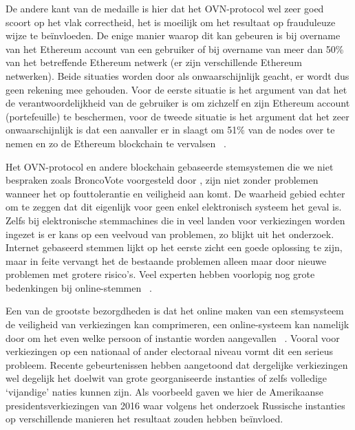 	De andere kant van de medaille is hier dat het OVN-protocol wel zeer goed scoort op het vlak correctheid, het is moeilijk om het resultaat op frauduleuze wijze te beïnvloeden. De enige manier waarop dit kan gebeuren is bij overname van het Ethereum account van een gebruiker of bij overname van meer dan 50\% van het betreffende Ethereum netwerk (er zijn verschillende Ethereum netwerken). Beide situaties worden door \textcite{McCorry2017} als onwaarschijnlijk geacht, er wordt dus geen rekening mee gehouden. Voor de eerste situatie is het argument van \textcite{McCorry2017} dat het de verantwoordelijkheid van de gebruiker is om zichzelf en zijn Ethereum account (portefeuille) te beschermen, voor de tweede situatie is het argument dat het zeer onwaarschijnlijk is dat een aanvaller er in slaagt om 51\% van de nodes over te nemen en zo de Ethereum blockchain te vervalsen ~\autocite{McCorry2017}.
	
	 Het OVN-protocol en andere blockchain gebaseerde stemsystemen die we niet bespraken zoals BroncoVote voorgesteld door , zijn niet zonder problemen wanneer het op fouttolerantie en veiligheid aan komt. De waarheid gebied echter om te zeggen dat dit eigenlijk voor geen enkel elektronisch systeem het geval is. Zelfs bij elektronische stemmachines die  in veel landen voor verkiezingen worden ingezet is er kans op een veelvoud van problemen, zo blijkt uit het \textcite{Norden2015} onderzoek. Internet gebaseerd stemmen lijkt op het eerste zicht een goede oplossing te zijn, maar in feite vervangt het de bestaande problemen alleen maar door nieuwe problemen met grotere risico's. Veel experten hebben voorlopig nog grote bedenkingen bij online-stemmen ~\autocite{Norden2015}. 
	 
	 Een van de grootste bezorgdheden is dat het online maken van een stemsysteem de veiligheid van verkiezingen kan comprimeren, een online-systeem kan namelijk door om het even welke persoon of instantie worden aangevallen ~\autocite{Norden2015}. Vooral voor verkiezingen op een nationaal of ander electoraal niveau vormt dit een serieus probleem. Recente gebeurtenissen hebben aangetoond dat dergelijke verkiezingen wel degelijk het doelwit van grote georganiseerde instanties of zelfs volledige `vijandige' naties kunnen zijn. Als voorbeeld gaven we hier de Amerikaanse presidentsverkiezingen van 2016 waar volgens het \textcite{Mueller2019} onderzoek Russische instanties op verschillende manieren het resultaat zouden hebben beïnvloed.
	 
